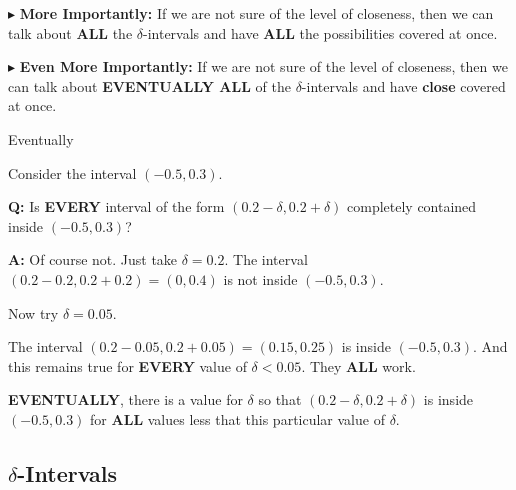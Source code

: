 \documentclass{ximera}
\begin{document}
\textbf{\textcolor{red!70!darkgray}{$\blacktriangleright$}} \textbf{\textcolor{purple!85!blue}{More Importantly:}} If we are not sure of the level of closeness, then we can talk about \textbf{\textcolor{red!70!black}{ALL}} the $\delta$-intervals and have \textbf{\textcolor{red!70!black}{ALL}} the possibilities covered at once.



\textbf{\textcolor{red!70!darkgray}{$\blacktriangleright$}} \textbf{\textcolor{purple!85!blue}{Even More Importantly:}} If we are not sure of the level of closeness, then we can talk about \textbf{\textcolor{red!70!black}{EVENTUALLY ALL}} of the $\delta$-intervals and have \textbf{\textcolor{red!70!black}{close}} covered at once.





\begin{example} Eventually


Consider the interval $(-0.5, 0.3)$.

\textbf{\textcolor{blue!55!black}{Q:}} Is \textbf{EVERY} interval of the form $(0.2 - \delta, 0.2 + \delta)$ completely contained inside $(-0.5, 0.3)$?


\textbf{\textcolor{blue!55!black}{A:}} Of course not.  Just take $\delta = 0.2$.  The interval $(0.2 - 0.2, 0.2 + 0.2) = (0, 0.4)$ is not inside $(-0.5, 0.3)$.



Now try $\delta = 0.05$.

The interval $(0.2 - 0.05, 0.2 + 0.05) = (0.15, 0.25)$ is  inside $(-0.5, 0.3)$.
And this remains true for \textbf{\textcolor{red!70!black}{EVERY}} value of $\delta < 0.05$.  They \textbf{\textcolor{red!70!black}{ALL}} work.


\textbf{\textcolor{red!70!black}{EVENTUALLY}}, there is a value for $\delta$ so that $(0.2 - \delta, 0.2 + \delta)$ is inside $(-0.5, 0.3)$ for \textbf{\textcolor{red!70!black}{ALL}} values less that this particular value of $\delta$.



\end{example}















\subsection*{$\delta$-Intervals}
\end{document}
